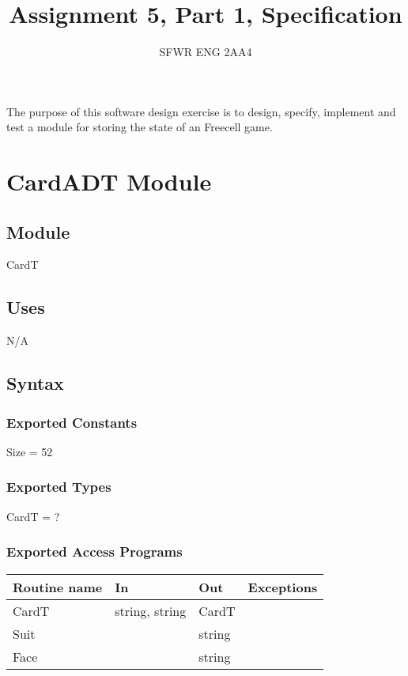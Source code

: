 \documentclass[12pt]{article}
\title{Assignment 5, Part 1, Specification}
\author{SFWR ENG 2AA4}
\begin{document}
\maketitle

The purpose of this software design exercise is to design, specify, implement and test a module for storing the state
of an Freecell game.
\newpage 
\section* {CardADT Module}

\subsection*{Module}
CardT
\subsection* {Uses}

N/A

\subsection* {Syntax}

\subsubsection* {Exported Constants}
Size = 52 \\
\subsubsection* {Exported Types}
	CardT = ?
\subsubsection* {Exported Access Programs}

\begin{tabular}{| l | l | l | p{7cm} |}
\hline
\textbf{Routine name} & \textbf{In} & \textbf{Out} & \textbf{Exceptions}\\

\hline
CardT & string, string & CardT & \\
\hline
Suit & ~ & string & \\
\hline
Face & ~ & string & \\
\hline



\end{tabular}
\end{document}
